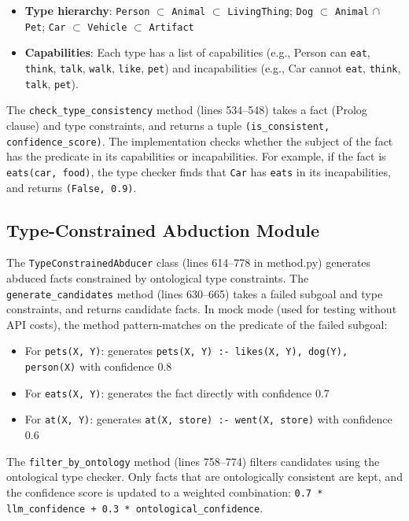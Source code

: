\documentclass[11pt,letterpaper]{article}
\begin{document}
\begin{itemize}
    \item \textbf{Type hierarchy}: \texttt{Person} $\subset$ \texttt{Animal} $\subset$ \texttt{LivingThing}; \texttt{Dog} $\subset$ \texttt{Animal} $\cap$ \texttt{Pet}; \texttt{Car} $\subset$ \texttt{Vehicle} $\subset$ \texttt{Artifact}
    \item \textbf{Capabilities}: Each type has a list of capabilities (e.g., Person can \texttt{eat}, \texttt{think}, \texttt{talk}, \texttt{walk}, \texttt{like}, \texttt{pet}) and incapabilities (e.g., Car cannot \texttt{eat}, \texttt{think}, \texttt{talk}, \texttt{pet}).
\end{itemize}

The \texttt{check\_type\_consistency} method (lines 534--548) takes a fact (Prolog clause) and type constraints, and returns a tuple \texttt{(is\_consistent, confidence\_score)}. The implementation checks whether the subject of the fact has the predicate in its capabilities or incapabilities. For example, if the fact is \texttt{eats(car, food)}, the type checker finds that \texttt{Car} has \texttt{eats} in its incapabilities, and returns \texttt{(False, 0.9)}.

\subsection{Type-Constrained Abduction Module}

The \texttt{TypeConstrainedAbducer} class (lines 614--778 in method.py) generates abduced facts constrained by ontological type constraints. The \texttt{generate\_candidates} method (lines 630--665) takes a failed subgoal and type constraints, and returns candidate facts. In mock mode (used for testing without API costs), the method pattern-matches on the predicate of the failed subgoal:

\begin{itemize}
    \item For \texttt{pets(X, Y)}: generates \texttt{pets(X, Y) :- likes(X, Y), dog(Y), person(X)} with confidence 0.8
    \item For \texttt{eats(X, Y)}: generates the fact directly with confidence 0.7
    \item For \texttt{at(X, Y)}: generates \texttt{at(X, store) :- went(X, store)} with confidence 0.6
\end{itemize}

The \texttt{filter\_by\_ontology} method (lines 758--774) filters candidates using the ontological type checker. Only facts that are ontologically consistent are kept, and the confidence score is updated to a weighted combination: \texttt{0.7 * llm\_confidence + 0.3 * ontological\_confidence}.
\end{document}
